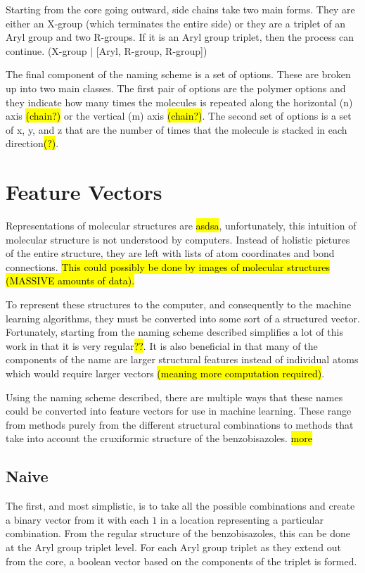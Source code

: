 \documentclass[10pt]{article}
\begin{document}
Starting from the core going outward, side chains take two main forms. They are either an X-group (which terminates the entire side) or they are a triplet of an Aryl group and two R-groups. If it is an Aryl group triplet, then the process can continue. (X-group $\vert$ [Aryl, R-group, R-group])

The final component of the naming scheme is a set of options. These are broken up into two main classes. The first pair of options are the polymer options and they indicate how many times the molecules is repeated along the horizontal (n) axis \hl{(chain?)} or the vertical (m) axis \hl{(chain?)}. The second set of options is a set of x, y, and z that are the number of times that the molecule is stacked in each direction\hl{(?)}.


\section{Feature Vectors}

Representations of molecular structures are \hl{asdsa}, unfortunately, this intuition of molecular structure is not understood by computers. Instead of holistic pictures of the entire structure, they are left with lists of atom coordinates and bond connections. \hl{This could possibly be done by images of molecular structures (MASSIVE amounts of data).}

To represent these structures to the computer, and consequently to the machine learning algorithms, they must be converted into some sort of a structured vector. Fortunately, starting from the naming scheme described simplifies a lot of this work in that it is very regular\hl{??}. It is also beneficial in that many of the components of the name are larger structural features instead of individual atoms which would require larger vectors \hl{(meaning more computation required)}.

Using the naming scheme described, there are multiple ways that these names could be converted into feature vectors for use in machine learning. These range from methods purely from the different structural combinations to methods that take into account the cruxiformic structure of the benzobisazoles. \hl{more}


\subsection{Naive}

The first, and most simplistic, is to take all the possible combinations and create a binary vector from it with each $1$ in a location representing a particular combination. From the regular structure of the benzobisazoles, this can be done at the Aryl group triplet level. For each Aryl group triplet as they extend out from the core, a boolean vector based on the components of the triplet is formed.
\end{document}
